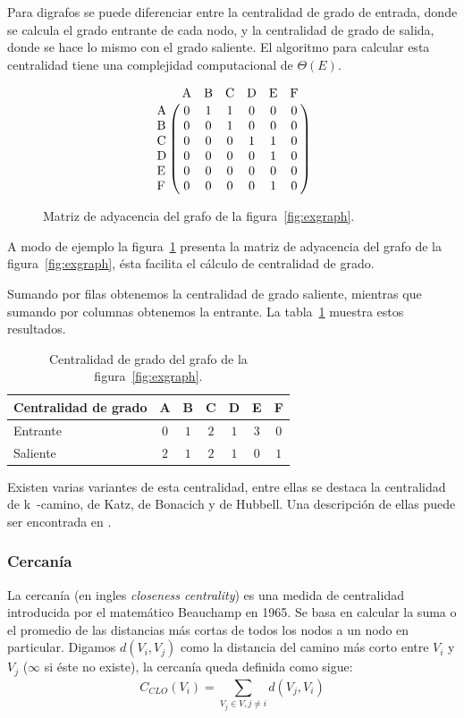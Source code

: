 Para digrafos se puede diferenciar entre la centralidad de grado de entrada,
donde se calcula el grado entrante de cada nodo, y la centralidad de grado de
salida, donde se hace lo mismo con el grado saliente. El algoritmo para calcular 
esta centralidad tiene una complejidad computacional de $\Theta (E)$.

\begin{figure}[htpb]
  \begin{equation*}
    \bordermatrix{
       ~  & $A$ & $B$ & $C$ & $D$ & $E$ & $F$ \cr
      $A$ &  0  &  1  &  1  &  0  &  0  &  0  \cr
      $B$ &  0  &  0  &  1  &  0  &  0  &  0  \cr
      $C$ &  0  &  0  &  0  &  1  &  1  &  0  \cr
      $D$ &  0  &  0  &  0  &  0  &  1  &  0  \cr
      $E$ &  0  &  0  &  0  &  0  &  0  &  0  \cr
      $F$ &  0  &  0  &  0  &  0  &  1  &  0  \cr
    }
  \end{equation*}
  \caption{Matriz de adyacencia del grafo de la figura~\ref{fig:exgraph}.}
  \label{fig:adjmatrix}
\end{figure}

A modo de ejemplo la figura~\ref{fig:adjmatrix} presenta la matriz de adyacencia
del grafo de la figura~\ref{fig:exgraph}, ésta facilita el cálculo de
centralidad de grado.

Sumando por filas obtenemos la centralidad de grado saliente, mientras que
sumando por columnas obtenemos la entrante. La tabla~\ref{tab:excgrad} muestra
estos resultados.
\begin{table}[htpb]
  \centering
  \begin{tabular}{|l|c|c|c|c|c|c|}
    \hline
    Centralidad de grado &  A  &  B  &  C  &  D  &  E  &  F  \\\hline
    Entrante             & $0$ & $1$ & $2$ & $1$ & $3$ & $0$ \\\hline
    Saliente             & $2$ & $1$ & $2$ & $1$ & $0$ & $1$ \\\hline
  \end{tabular}
  \caption{Centralidad de grado del grafo de la figura~\ref{fig:exgraph}.}
  \label{tab:excgrad}
\end{table}

Existen varias variantes de esta centralidad, entre ellas se destaca la
centralidad de k~-camino, de Katz, de Bonacich y de Hubbell. Una descripción de
ellas puede ser encontrada en \cite{sun2011survey}.

\subsubsection{Cercanía}
La cercanía (en ingles \emph{closeness centrality}) es una medida de centralidad
introducida por el matemático Beauchamp en 1965\cite{beauchamp1965improved}. Se
basa en calcular la suma o el promedio de las distancias más cortas de todos los
nodos a un nodo en particular. Digamos $d(V_i, V_j)$ como la distancia del
camino más corto entre $V_i$ y $V_j$ ($\infty$ si éste no existe), la cercanía
queda definida como sigue:
\begin{equation}
  \label{eq:far}
  C_{CLO}(V_i) = \sum_{V_j \in V, j\neq i}^{} d(V_j, V_i)
\end{equation}

